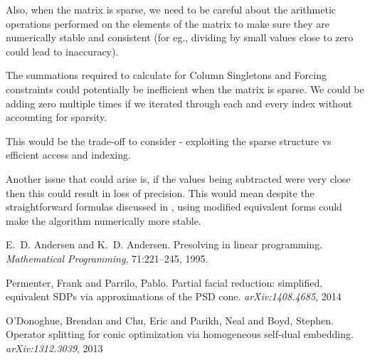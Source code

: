 \documentclass[twoside]{article}
\begin{document}
\begin{multicols}{2}
Also, when the matrix is sparse, we need to be careful about the arithmetic operations performed on the elements of the matrix to make sure they are numerically stable and consistent (for eg., dividing by small values close to zero could lead to inaccuracy).

The summations required to calculate for Column Singletons and Forcing constraints could potentially be inefficient when the matrix is sparse. We could be adding zero multiple times if we iterated through each and every index without accounting for sparsity. 

This would be the trade-off to consider - exploiting the sparse structure vs efficient access and indexing.

Another issue that could arise is, if the values being subtracted were very close then this could result in loss of precision. This would mean despite the straightforward formulas discussed in \cite{ipm:Andersen9}, using modified equivalent forms could make the algorithm numerically more stable.  




\begin{thebibliography}{99} %

E.~D. Andersen and K.~D. Andersen.
Presolving in linear programming.
\textit{ Mathematical Programming}, 71:221--245, 1995.

Permenter, Frank and Parrilo, Pablo.
Partial facial reduction: simplified, equivalent SDPs via approximations of the PSD cone.
\textit{ arXiv:1408.4685}, 2014

O'Donoghue, Brendan and Chu, Eric and Parikh, Neal and Boyd, Stephen.
Operator splitting for conic optimization via homogeneous self-dual embedding.
\textit{ arXiv:1312.3039}, 2013



 \medskip
\end{thebibliography}
%
%


\end{multicols}
\end{document}
